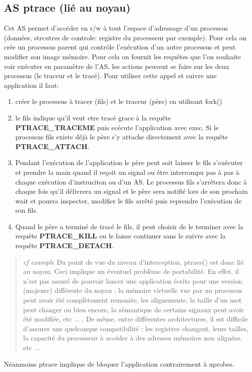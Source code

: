 \documentclass{article}
\begin{document}
\subsection{AS ptrace (lié au noyau)}
Cet AS permet d'accéder en r/w à tout l'espace d'adressage d'un
processus (données, strcutres de controle: registre du processeur par
exemple). Pour cela on crée un processus parent qui contrôle
l'exécution d'un autre processus et peut modifier son image
mémoire. Pour cela on fournit les requêtes que l'on souhaite voir
exécuter en paramètre de l'AS, les actions peuvent se faire sur les
deux processus (le traceur et le tracé). Pour utiliser cette appel et
suivre une application il faut:
\begin{enumerate}
\item créer le processus à tracer (fils) et le traceur (père) en
  utilisant fork()
\item le fils indique qu'il veut etre tracé grace à la requête
  \textbf{PTRACE\_TRACEME} puis ecécute l'application avec exec. Si le
  processus fils existe déjà le père s'y attache directement avec la
  requête \textbf{PTRACE\_ATTACH}.
\item Pendant l'exécution de l'application le père peut soit laisser
  le fils s'exécuter et prendre la main quand il reçoit un signal ou
  être interrompu pas à pas à chaque exécution d'instruciton ou d'un
  AS. Le processus fils s'arrêtera donc à chaque fois qu'il délivrera
  un signal et le père sera notifié lors de son prochain wait et
  pourra inspecter, modifier le fils arrêté puis reprendre l'exécution
  de son fils.
\item Quand le père a terminé de tracé le fils, il peut choisir de le
  terminer avec la requête \textbf{PTRACE\_KILL} ou le laisse
  continuer sans le suivre avec la requête \textbf{PTRACE\_DETACH}.
\end{enumerate}

\begin{quotation}
\textit{cf example} {\color{green} Du point de vue du niveau
  d’interception, ptrace() est donc lié au noyau. Ceci implique un
  éventuel problème de portabilité. En effet, il n’est pas assuré de
  pouvoir lancer une application écrite pour une version (majeure)
  différente du noyau : la mémoire virtuelle vue par un processus peut
  avoir été complètement remaniée, les alignements, la taille d’un mot
  peut changer ou bien encore, la sémantique de certains signaux peut
  avoir été modifiée, etc ... . De même, entre différentes
  architectures, il est difficile d’assurer une quelconque
  compatibilité : les registres changent, leurs tailles, la capacité
  du processeur à accéder à des adresses mémoires non alignées, etc
  ...  }
\end{quotation}
Néanmoins ptrace implique de bloquer l'application contrairement à
uprobes.
\end{document}
